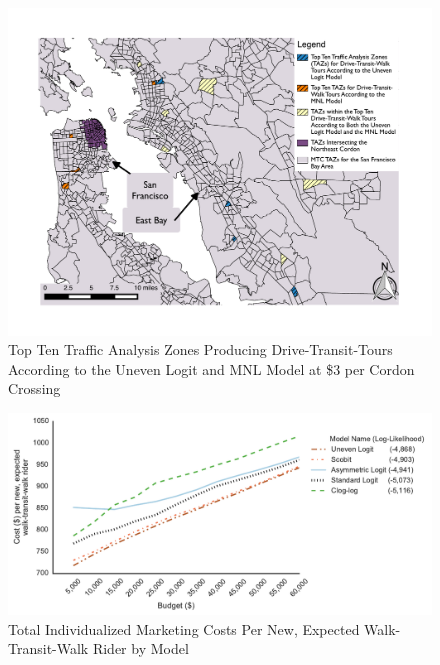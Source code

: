\begin{figure}
\centering
\includegraphics[width=\textwidth]{chapter3/images/new_Fig_6}
\caption{Top Ten Traffic Analysis Zones Producing Drive-Transit-Tours \newline According to the Uneven Logit and MNL Model at \$3 per Cordon Crossing}
\label{fig:drive_transit_walk_map}
\end{figure}

\begin{figure}
\centering
\includegraphics[width=\textwidth]{chapter3/images/Fig8}
\caption{Total Individualized Marketing Costs Per New, Expected Walk-Transit-Walk Rider by Model}
\label{fig:tdm_program_efficiencies}
\end{figure}

